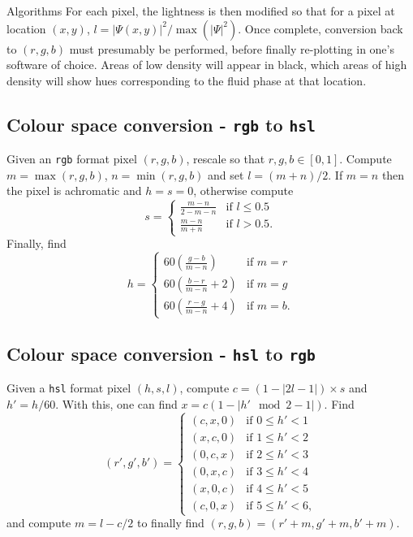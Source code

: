 \begin{chapter}{Algorithms\label{app:algorithms}}
For each pixel, the lightness is then modified so that for a pixel at location $(x,y)$, $l = |\Psi(x,y)|^2/\max(|\Psi|^2)$. Once complete, conversion back to $(r,g,b)$ must presumably be performed, before finally re-plotting in one's software of choice. Areas of low density will appear in black, which areas of high density will show hues corresponding to the fluid phase at that location.

\subsection{Colour space conversion - {\tt rgb} to {\tt hsl}}
Given an {\tt rgb} format pixel $(r,g,b)$, rescale so that $r,g,b \in [0,1]$. Compute $m = \max(r,g,b)$, $n = \min(r,g,b)$ and set $l = (m+n)/2$. If $m=n$ then the pixel is achromatic and $h=s=0$, otherwise compute
\begin{equation}
s =
    \begin{cases}
      \frac{m-n}{2 - m - n} &\mbox{if } l \leq 0.5 \\
      \frac{m-n}{m+n} &\mbox{if } l > 0.5.
    \end{cases}
\end{equation}
Finally, find 
\begin{equation}
h =
    \begin{cases}
      60(\frac{g-b}{m-n}) &\mbox{if } m=r \\
      60(\frac{b-r}{m-n}+2) &\mbox{if } m=g \\
      60(\frac{r-g}{m-n}+4) &\mbox{if } m=b.
    \end{cases}
\end{equation}

\subsection{Colour space conversion - {\tt hsl} to {\tt rgb}}
Given a {\tt hsl} format pixel $(h,s,l)$, compute $c = (1 - | 2l - 1|) \times s$ and $h' = h/60$. With this, one can find $x = c(1-|h' \mod 2 - 1|)$. Find
\begin{equation}
(r', g', b') =
    \begin{cases}
      (c, x, 0) &\mbox{if } 0 \leq h' < 1 \\
      (x, c, 0) &\mbox{if } 1 \leq h' < 2 \\
      (0, c, x) &\mbox{if } 2 \leq h' < 3 \\
      (0, x, c) &\mbox{if } 3 \leq h' < 4 \\
      (x, 0, c) &\mbox{if } 4 \leq h' < 5 \\
      (c, 0, x) &\mbox{if } 5 \leq h'< 6,
    \end{cases}
\end{equation}
and compute $m = l - c/2$ to finally find $(r,g,b) = (r'+m,g'+m,b'+m).$
\end{chapter}
